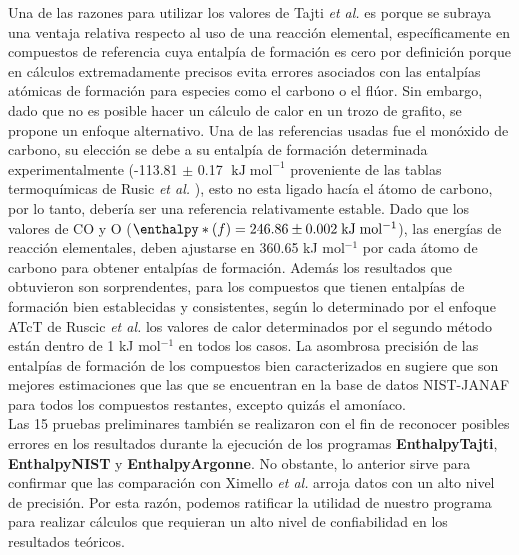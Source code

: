 Una de las razones para utilizar los valores de Tajti \textit{et al.} \cite{Tajti2004} es porque se subraya una ventaja relativa respecto al uso de una reacción elemental, específicamente en compuestos de referencia cuya entalpía de formación es cero por definición porque en cálculos extremadamente precisos evita errores asociados con las entalpías atómicas de formación para especies como el carbono o el flúor. Sin embargo, dado que no es posible hacer un cálculo de calor en un trozo de grafito, se propone un enfoque alternativo. Una de las referencias usadas fue el monóxido de carbono, su elección se debe a su entalpía de formación determinada experimentalmente (-113.81 $\pm$ 0.17 $\;\mathrm{kJ\;mol^{-1}}$ proveniente de las tablas termoquímicas de Rusic \textit{et al.} \cite{Ruscic2005}), esto no esta ligado hacía el átomo de carbono, por lo tanto, debería ser una referencia relativamente estable. Dado que los valores de CO y O ($\enthalpy*(f){}= 246.86 \pm 0.002\;\mathrm{kJ\;mol^{-1}}$), las energías de reacción elementales, deben ajustarse en 360.65 kJ mol$^{-1}$ por cada átomo de carbono para obtener entalpías de formación. Además los resultados que obtuvieron son sorprendentes, para los compuestos que tienen entalpías de formación bien establecidas y consistentes, según lo determinado por el enfoque ATcT de Ruscic \textit{et al.}\cite{Ruscic2005} los valores de calor determinados por el segundo método están dentro de 1 kJ mol$^{-1}$ en todos los casos. La asombrosa precisión de las entalpías de formación de los compuestos bien caracterizados en \cite{Tajti2004} sugiere que son mejores estimaciones que las que se encuentran en la base de datos NIST-JANAF \cite{NIST1998} para todos los compuestos restantes, excepto quizás el amoníaco.\\

Las 15 pruebas preliminares también se realizaron con el fin de reconocer posibles errores en los resultados durante la ejecución de los programas \textbf{EnthalpyTajti}, \textbf{EnthalpyNIST} y \textbf{EnthalpyArgonne}. No obstante, lo anterior sirve para confirmar que las comparación con Ximello \textit{et al.} \cite{Ximello2020} arroja datos con un alto nivel de precisión. Por esta razón, podemos ratificar la utilidad de nuestro programa para realizar cálculos que requieran un alto nivel de confiabilidad en los resultados teóricos. 










